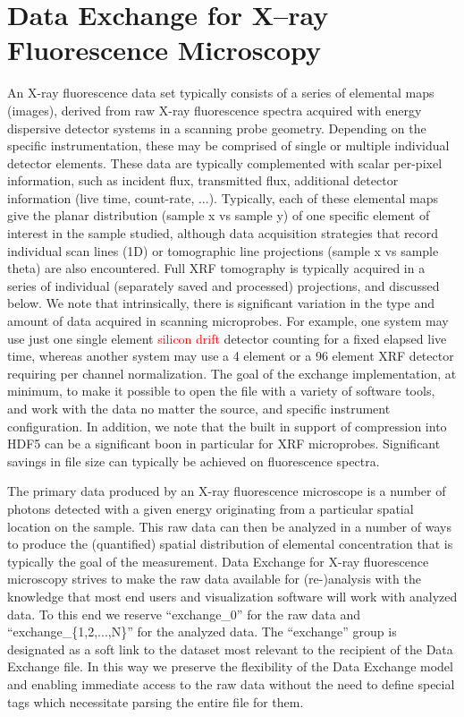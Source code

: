 \documentclass[pdf]{iucr}              %
\begin{document}
\section{Data Exchange for X--ray Fluorescence Microscopy}

An X-ray fluorescence data set typically consists of a series of elemental maps (images), derived from raw X-ray fluorescence spectra acquired with energy dispersive detector systems in a scanning probe geometry. Depending on the specific instrumentation, these may be comprised of single or multiple individual detector elements. These data are typically complemented with scalar per-pixel information, such as incident flux, transmitted flux, additional detector information (live time, count-rate, ...). Typically, each of these elemental maps give the planar distribution (sample x vs sample y) of one specific element of interest in the sample studied, although data acquisition strategies that record individual scan lines (1D) or tomographic line projections (sample x vs sample theta) are also encountered. Full XRF tomography is typically acquired in a series of individual (separately saved and processed) projections, and discussed below. We note that intrinsically, there is significant variation in the type and amount of data acquired in scanning microprobes. For example, one system may use just one single element \textcolor{red}{silicon drift} detector counting for a fixed elapsed live time, whereas another system may use a 4 element or a 96 element XRF detector requiring per channel normalization. The goal of the exchange implementation, at minimum, to make it possible to open the file with a variety of software tools, and work with the data no matter the source, and specific instrument configuration. In addition, we note that the built in support of compression into HDF5 can be a significant boon in particular for XRF microprobes. Significant savings in file size can typically be achieved on fluorescence spectra. 

The primary data produced by an X-ray fluorescence microscope is a number of photons detected with a given energy originating from a particular spatial location on the sample. This raw data can then be analyzed in a number of ways to produce the (quantified) spatial distribution of elemental concentration that is typically the goal of the measurement. Data Exchange for X-ray fluorescence microscopy strives to make the raw data available for (re-)analysis with the knowledge that most end users and visualization software will work with analyzed data. To this end we reserve ``exchange\_0'' for the raw data and ``exchange\_\{1,2,...,N\}'' for the analyzed data. The ``exchange'' group is designated as a soft link to the dataset most relevant to the recipient of the Data Exchange file. In this way we preserve the flexibility of the Data Exchange model and enabling immediate access to the raw data without the need to define special tags which necessitate parsing the entire file for them.
\end{document}
